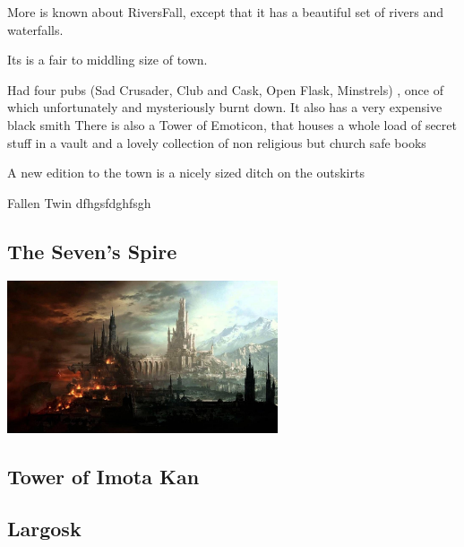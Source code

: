 \noindent 

More is known about RiversFall, except that it has a beautiful set of rivers and waterfalls.

Its is a fair to middling size of town.

Had four pubs (Sad Crusader, Club and Cask, Open Flask, Minstrels) , once of which unfortunately and mysteriously burnt down.
It also has a very expensive black smith
There is also a Tower of Emoticon, that houses a whole load of secret stuff in a vault and a lovely collection of non religious but church safe books

A new edition to the town is a nicely sized ditch on the outskirts

\begin{DndSidebar}{Fallen Twin}
 dfhgsfdghfsgh
\end{DndSidebar}

\smallskip

\subsection*{The Seven's Spire} 

\vspace{5mm}

\begin{center}
\includegraphics[width=80mm]{./content/img/7spire.jpg}
\begin{figure}[h]
\end{figure}
\end{center}

\noindent 

\subsection*{Tower of Imota Kan} 

\smallskip

\subsection*{Largosk} 

